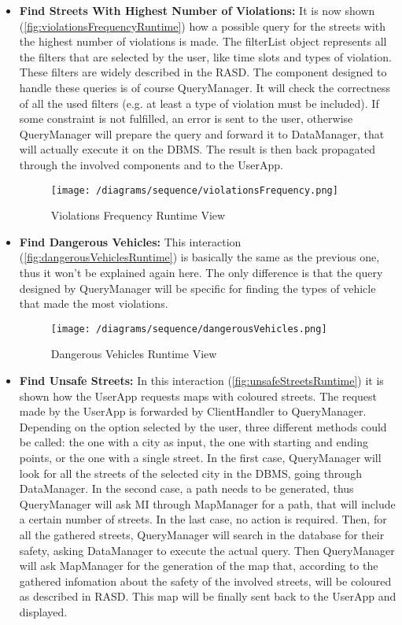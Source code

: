 			\begin{itemize}
				\item \textbf{Find Streets With Highest Number of Violations:} It is now shown (\autoref{fig:violationsFrequencyRuntime}) how a possible query for the streets with the highest number of violations is made. The filterList object represents all the filters that are selected by the user, like time slots and types of violation. These filters are widely described in the RASD. The component designed to handle these queries is of course QueryManager. It will check the correctness of all the used filters (e.g. at least a type of violation must be included). If some constraint is not fulfilled, an error is sent to the user, otherwise QueryManager will prepare the query and forward it to DataManager, that will actually execute it on the DBMS. The result is then back propagated through the involved components and to the UserApp.
				
				\begin{figure}[h!]
					\centering
					\texttt{[image: /diagrams/sequence/violationsFrequency.png]}
					\caption{\label{fig:violationsFrequencyRuntime} Violations Frequency Runtime View}
				\end{figure}
			
				\item \textbf{Find Dangerous Vehicles:} This interaction (\autoref{fig:dangerousVehiclesRuntime}) is basically the same as the previous one, thus it won't be explained again here. The only difference is that the query designed by QueryManager will be specific for finding the types of vehicle that made the most violations.
				
				\begin{figure}[h!]
					\centering
					\texttt{[image: /diagrams/sequence/dangerousVehicles.png]}
					\caption{\label{fig:dangerousVehiclesRuntime} Dangerous Vehicles Runtime View}
				\end{figure}
			
				\item \textbf{Find Unsafe Streets:} In this interaction (\autoref{fig:unsafeStreetsRuntime}) it is shown how the UserApp requests maps with coloured streets. The request made by the UserApp is forwarded by ClientHandler to QueryManager. Depending on the option selected by the user, three different methods could be called: the one with a city as input, the one with starting and ending points, or the one with a single street. In the first case, QueryManager will look for all the streets of the selected city in the DBMS, going through DataManager. In the second case, a path needs to be generated, thus QueryManager will ask MI through MapManager for a path, that will include a certain number of streets. In the last case, no action is required. Then, for all the gathered streets, QueryManager will search in the database for their safety, asking DataManager to execute the actual query. Then QueryManager will ask MapManager for the generation of the map that, according to the gathered infomation about the safety of the involved streets, will be coloured as described in RASD. This map will be finally sent back to the UserApp and displayed.
				

\end{itemize}
